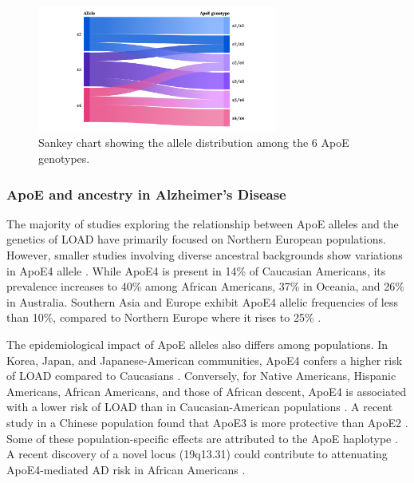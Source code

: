 \documentclass{amsart}
\theoremstyle{plain}
\begin{document}
\begin{figure}[]
  \includegraphics[width=0.7\textwidth]{figures/ApoE@2x.png}
    \caption{Sankey chart showing the allele distribution among the 6 ApoE genotypes.}
  \label{fig1}
\end{figure}

\subsubsection{ApoE and ancestry in Alzheimer's Disease}
The majority of studies exploring the relationship between ApoE alleles and the genetics of LOAD have primarily focused on Northern European populations\cite{Yang2023ApolipoproteinDisease}. However, smaller studies involving diverse ancestral backgrounds show variations in ApoE4 allele \cite{Yang2023ApolipoproteinDisease}. While ApoE4 is present in 14\% of Caucasian Americans, its prevalence increases to 40\% among African Americans, 37\% in Oceania, and 26\% in Australia. Southern Asia and Europe exhibit ApoE4 allelic frequencies of less than 10\%, compared to Northern Europe where it rises to 25\% \cite{Belloy2019AForward, Egert2012ApoEFactors, Eisenberg2010WorldwideHistory, Logue2011AAmericans}.

The epidemiological impact of ApoE alleles also differs among populations. In Korea, Japan, and Japanese-American communities, ApoE4 confers a higher risk of LOAD compared to Caucasians \cite{Farrer1997EffectsMeta-analysis}. Conversely, for Native Americans, Hispanic Americans, African Americans, and those of African descent, ApoE4 is associated with a lower risk of LOAD than in Caucasian-American populations \cite{Farrer1997EffectsMeta-analysis, Blue2019LocalHispanics, Suchy-Dicey2022APOEStudy, Rajabli2018AncestralPopulations, Naslavsky2022GlobalSample}. A recent study in a Chinese population found that ApoE3 is more protective than ApoE2 \cite{Chen2011ApolipoproteinDisease}. Some of these population-specific effects are attributed to the ApoE haplotype \cite{Blue2019LocalHispanics, Rajabli2018AncestralPopulations}. A recent discovery of a novel locus (19q13.31) could contribute to attenuating ApoE4-mediated AD risk in African Americans \cite{Rajabli2022AAncestry}.
\end{document}
